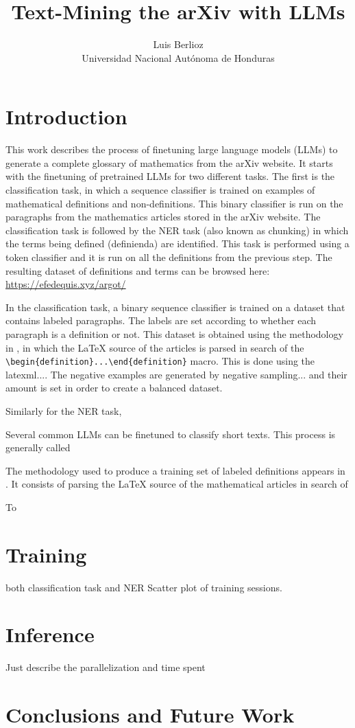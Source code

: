 \documentclass{article}
\title{Text-Mining the arXiv with LLMs}
\author{Luis Berlioz\\
    Universidad Nacional Autónoma de Honduras}
\begin{document}
\begin{abstract}
    
\end{abstract}
\section{Introduction}

This work describes the process of finetuning large language models (LLMs) to generate a complete glossary of mathematics from the arXiv website.  It starts with the finetuning of pretrained LLMs for two different tasks. The first is the classification task, in which a sequence classifier is trained on examples of mathematical definitions and non-definitions. This binary classifier is run on the paragraphs from the mathematics articles stored in the arXiv website. The classification task is followed by the NER task (also known as chunking) in which the terms being defined (definienda) are identified. This task is performed using a token classifier and it is run on all the definitions from the previous step. The resulting dataset of definitions and terms can be browsed here: \url{https://efedequis.xyz/argot/}

In the classification task, a binary sequence classifier is trained on a dataset that contains labeled paragraphs. The labels are set according to whether each paragraph is a definition or not. This dataset is obtained using the methodology in \cite{Deyan1}, in which the \LaTeX{} source of the articles is parsed in search of the \verb|\begin{definition}...\end{definition}| macro. This is done using the latexml....
The negative examples are generated by negative sampling... and their amount is set in order to create a balanced dataset.

Similarly for the NER task, 

Several common LLMs can be finetuned to classify short texts. This process is generally called 

The methodology used to produce a training set of labeled definitions appears in \cite{Deyan1, glossary}. It consists of parsing the \LaTeX{} source of the mathematical articles in search of 

To 


\section{Training}
both classification task and NER
Scatter plot of training sessions.

\section{Inference}
Just describe the parallelization and time spent

\section{Conclusions and Future Work}



\end{document}
